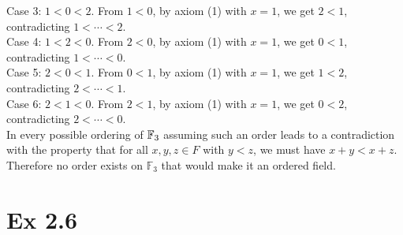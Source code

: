 \documentclass{report}
\begin{document}
\begin{proofWithHibiscus}
  Case 3: $1<0<2$.  
  From $1<0$, by axiom (1) with $x=1$, we get $2<1$, contradicting $1<\cdots<2$.  \\
  
  Case 4: $1<2<0$.  
  From $2<0$, by axiom (1) with $x=1$, we get $0<1$, contradicting $1<\cdots<0$.  \\
  
  Case 5: $2<0<1$.  
  From $0<1$, by axiom (1) with $x=1$, we get $1<2$, contradicting $2<\cdots<1$.  \\
  
  Case 6: $2<1<0$.  
  From $2<1$, by axiom (1) with $x=1$, we get $0<2$, contradicting $2<\cdots<0$.  \\
  
  In every possible ordering of $\mathbb{F}_{3}$ assuming such an order leads to a contradiction with
  the property that for all $x,y,z \in F$ with $y<z$, we must have $x+y<x+z$. Therefore no order exists on $\mathbb{F}_3$ that would make it an ordered field.

\end{proofWithHibiscus}


\section*{Ex 2.6}


\end{document}
